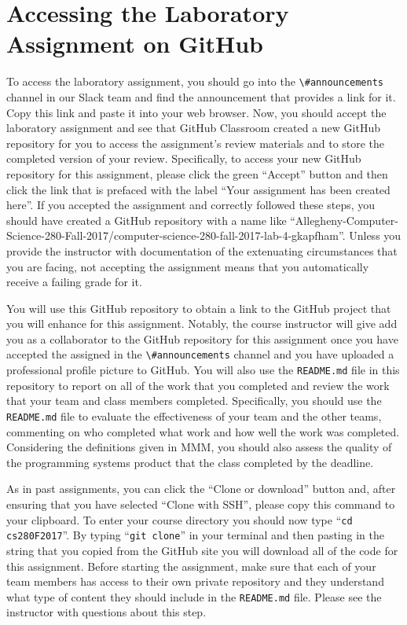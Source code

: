 \documentclass[11pt]{article}
\newcommand{\reflection}{\lstinline{README.md}}
\newcommand{\command}[1]{``\lstinline{#1}''}
\newcommand{\channel}[1]{\lstinline{#1}}
\begin{document}
\section*{Accessing the Laboratory Assignment on GitHub}

To access the laboratory assignment, you should go into the \channel{\#announcements} channel in our Slack team and find
the announcement that provides a link for it. Copy this link and paste it into your web browser. Now, you should accept
the laboratory assignment and see that GitHub Classroom created a new GitHub repository for you to access the
assignment's review materials and to store the completed version of your review. Specifically, to access your new
GitHub repository for this assignment, please click the green ``Accept'' button and then click the link that is prefaced
with the label ``Your assignment has been created here''. If you accepted the assignment and correctly followed these
steps, you should have created a GitHub repository with a name like
``Allegheny-Computer-Science-280-Fall-2017/computer-science-280-fall-2017-lab-4-gkapfham''. Unless you provide the
instructor with documentation of the extenuating circumstances that you are facing, not accepting the assignment means
that you automatically receive a failing grade for it.

You will use this GitHub repository to obtain a link to the GitHub project that you will enhance for this assignment.
Notably, the course instructor will give add you as a collaborator to the GitHub repository for this assignment once you
have accepted the assigned in the \channel{\#announcements} channel and you have uploaded a professional profile picture
to GitHub. You will also use the \reflection{} file in this repository to report on all of the work that you completed
and review the work that your team and class members completed. Specifically, you should use the \reflection{} file to
evaluate the effectiveness of your team and the other teams, commenting on who completed what work and how well the work
was completed. Considering the definitions given in MMM, you should also assess the quality of the programming systems
product that the class completed by the deadline.

As in past assignments, you can click the ``Clone or download'' button and, after ensuring that you have selected
``Clone with SSH'', please copy this command to your clipboard. To enter your course directory you should now type
\command{cd cs280F2017}. By typing \command{git clone} in your terminal and then pasting in the string that you copied
from the GitHub site you will download all of the code for this assignment. Before starting the assignment, make sure
that each of your team members has access to their own private repository and they understand what type of content they
should include in the \reflection{} file. Please see the instructor with questions about this step.
\end{document}
